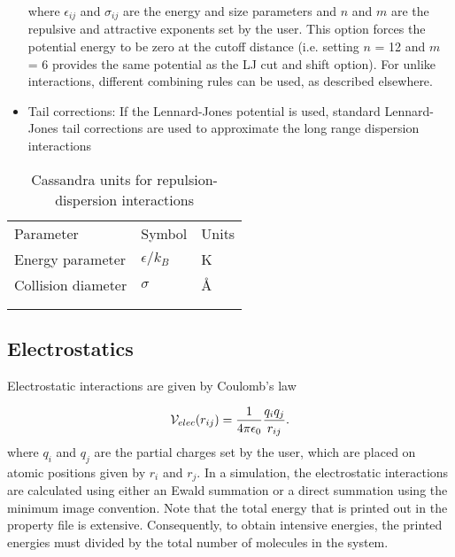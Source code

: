 \begin{itemize}
where $\epsilon_{ij}$ and $\sigma_{ij}$ are the energy and size
parameters and $n$ and $m$ are the repulsive and attractive exponents set by the user. This
option forces the potential energy to be zero at the cutoff
distance (i.e. setting $n$ = 12 and $m$ = 6 provides the same potential as the LJ cut and shift option). For unlike interactions, different 
combining rules can be used, as described elsewhere.


\item Tail corrections: If the Lennard-Jones potential is used, standard Lennard-Jones tail corrections are used to approximate the long range dispersion interactions

\end{itemize}

\begin{center}
\begin{table}[h]
	\begin{center}
	\caption{Cassandra units for repulsion-dispersion interactions}
	\begin{tabular} {l l l} \\ \hline \hline
	 Parameter & Symbol &  Units \\
	Energy parameter 	& $\epsilon/k_B$ & K \\
	Collision diameter &	 $\sigma$ & \AA \\ \\ \hline \\
	\end{tabular}
	\end{center}
	\label{Tab:LJ_Units}
\end{table}
\end{center}

\subsection{Electrostatics}\label{Sec:qq}

Electrostatic interactions are given by  Coulomb's law

\begin{equation}
{\cal V}_{elec} (r_{ij}) = \frac{1}{4\pi\epsilon_0} \frac {q_i q_j} {r_{ij}}.
\label{Eq:Coulomb}
\end{equation}
where $q_i$ and $q_j$ are the partial charges set by the user, which are
placed on atomic positions given by $r_i$ and $r_j$. In a simulation,
the electrostatic interactions are calculated using either an Ewald
summation or a direct summation using the minimum image convention. Note that 
the total energy that is printed out in the property file is extensive. 
Consequently, to obtain intensive energies, the printed energies must divided by 
the total number of molecules in the system. 

